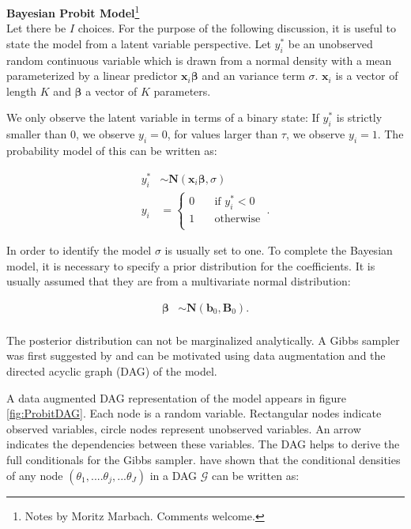 \documentclass[11pt,a4paper]{article}
\begin{document}
\textbf{Bayesian Probit Model}\footnote{Notes by Moritz Marbach. Comments welcome.} \\

Let there be $I$ choices. For the purpose of the following discussion, it is useful to state the model from a latent variable perspective. Let $y_{i}^{*}$ be an unobserved random continuous variable which is drawn from a normal density with a mean parameterized by a linear predictor $\mathbf{x}_i \boldsymbol{\beta}$ and an variance term $\sigma$. $\mathbf{x}_i$ is a vector of length $K$ and $\boldsymbol{\beta}$ a vector of $K$ parameters. 

We only observe the latent variable in terms of a binary state: If $y_{i}^{*}$ is strictly smaller than 0, we observe $y_{i}=0$, for values larger than $\tau$, we observe $y_{i}=1$. The probability model of this can be written as:

\begin{equation}
\begin{split}
y^{*}_i &\sim \mathrm{\mathbf{N}}(\textbf{x}_i \boldsymbol{\beta} ,\sigma) \\
y_{i} &= \left \{
\begin{array}{ll}
	0 & \quad \text{if $y_{i}^{*} < 0$ }\\
	1 & \quad \text{otherwise}\\
\end{array} \right..
\end{split}	
\end{equation}

In order to identify the model $\sigma$ is usually set to one. To complete the Bayesian model, it is necessary to specify a prior distribution for the coefficients. It is usually assumed that they are from a multivariate normal distribution: 

\begin{equation}
\begin{split}
\boldsymbol{\beta} &\sim \mathrm{\mathbf{N}}(\textbf{b}_0, \textbf{B}_0). \\
\end{split}
\end{equation}

The posterior distribution can not be marginalized analytically. A Gibbs sampler was first suggested by \citet{Albert.Chib.1993} and can be motivated using data augmentation and the directed acyclic graph (DAG) of the model. 

A data augmented DAG representation of the model appears in figure \ref{fig:ProbitDAG}. Each node is a random variable. Rectangular nodes indicate observed variables, circle nodes represent unobserved variables. An arrow indicates the dependencies between these variables. The DAG helps to derive the full conditionals for the Gibbs sampler. \citet{Lauritzen.et.al.1990} have shown that the conditional densities of any node $(\theta_1, .... \theta_j,...\theta_J)$ in a DAG $\mathcal{G}$ can be written as:
\end{document}
